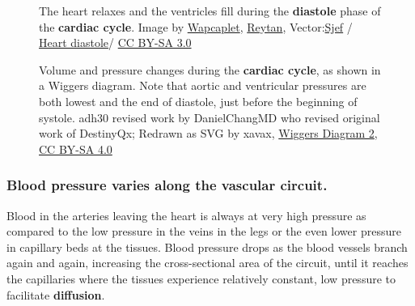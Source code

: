 \documentclass[
  letterpaper,
  DIV=11,
  numbers=noendperiod,
  oneside]{scrartcl}
\begin{document}
\begin{figure}

{\centering 

}

\caption{\label{fig-diastole}The heart relaxes and the ventricles fill
during the \textbf{diastole} phase of the \textbf{cardiac cycle}. Image
by
\href{href=\%22https://en.wikipedia.org/wiki/User:Wapcaplet}{Wapcaplet},
\href{https://commons.wikimedia.org/wiki/User:Reytan}{Reytan},
Vector:\href{https://commons.wikimedia.org/wiki/User:Sjef}{Sjef} /
\href{https://commons.wikimedia.org/wiki/File:Heart_diasystole.svg}{Heart
diastole}/ \href{https://creativecommons.org/licenses/by-sa/3.0/}{CC
BY-SA 3.0}}

\end{figure}

\begin{figure}

{\centering 

}

\caption{\label{fig-wiggers}Volume and pressure changes during the
\textbf{cardiac cycle}, as shown in a Wiggers diagram. Note that aortic
and ventricular pressures are both lowest and the end of diastole, just
before the beginning of systole. adh30 revised work by DanielChangMD who
revised original work of DestinyQx; Redrawn as SVG by xavax,
\href{https://commons.wikimedia.org/wiki/File:Wiggers_Diagram_2.svg}{Wiggers
Diagram 2},
\href{https://creativecommons.org/licenses/by-sa/4.0/legalcode}{CC BY-SA
4.0}}

\end{figure}

\hypertarget{blood-pressure-varies-along-the-vascular-circuit.}{%
\subsubsection{Blood pressure varies along the vascular
circuit.}\label{blood-pressure-varies-along-the-vascular-circuit.}}

Blood in the arteries leaving the heart is always at very high pressure
as compared to the low pressure in the veins in the legs or the even
lower pressure in capillary beds at the tissues. Blood pressure drops as
the blood vessels branch again and again, increasing the cross-sectional
area of the circuit, until it reaches the capillaries where the tissues
experience relatively constant, low pressure to facilitate
\textbf{diffusion}.
\end{document}
